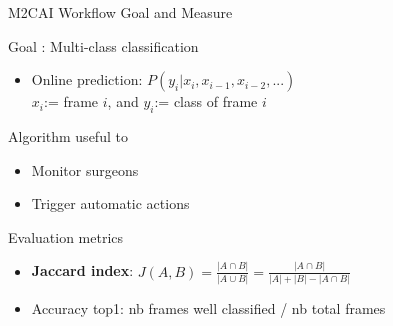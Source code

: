 \begin{frame}{M2CAI Workflow Goal and Measure}
	
		\begin{block}{Goal : Multi-class classification}
			\vspace{-.2cm}
	  	\begin{itemize}
	  		\item Online prediction: $P(y_i | x_i, x_{i-1}, x_{i-2}, ...)$   \\ \hspace{2cm}
	  		$x_i$:= frame $i$, and $y_i$:= class of frame $i$
	  	\end{itemize}
		\end{block}
		
		
		
		\begin{block}{Algorithm useful to}
			\vspace{-.2cm}
		\begin{itemize}
			\item Monitor surgeons
			\item Trigger automatic actions
		\end{itemize}
		\end{block}
		
		\begin{block}{Evaluation metrics}
						\vspace{-.2cm}
		\begin{itemize}
			\item \textbf{Jaccard index}:
	    $J(A,B) = \frac{| A \cap B |}{| A \cup B|} = \frac{| A \cap B |}{| A| + |B| - |A \cap B|}$
	    
	  		\item Accuracy top1: nb frames well classified / nb total frames
	  	\end{itemize}
	  	\end{block}
		
\end{frame}

